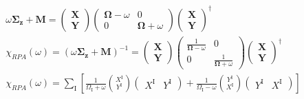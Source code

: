 \documentclass[12pt]{article}
\begin{document}
\begin{align}
\omega \mathbf{\Sigma_z} + \mathbf{M} = \begin{pmatrix}
\mathbf{X} \\
\mathbf{Y}
\end{pmatrix}
\begin{pmatrix}
\mathbf{\Omega } - \omega & 0 \\
0 & \mathbf{\Omega } + \omega
\end{pmatrix}
\begin{pmatrix}
\mathbf{X} \\
\mathbf{Y}
\end{pmatrix}^\dagger \\
\chi_{RPA}(\omega) = \left(\omega \mathbf{\Sigma_z} + \mathbf{M}\right)^{-1} = \begin{pmatrix}
\mathbf{X} \\
\mathbf{Y}
\end{pmatrix}
\begin{pmatrix}
\frac{1}{\mathbf{\Omega } - \omega} & 0 \\
0 & \frac{1}{\mathbf{\Omega } + \omega}
\end{pmatrix}
\begin{pmatrix}
\mathbf{X} \\
\mathbf{Y}
\end{pmatrix}^\dagger \\
\chi_{RPA}(\omega) = \sum_{\mathrm{I}}\left[\frac{1}{\Omega_{\mathrm{I}}+\omega}\binom{X^{\mathrm{I}}}{Y^{\mathrm{I}}}\left(\begin{array}{ll}
X^{\mathrm{I}} & Y^{\mathrm{I}}
\end{array}\right)+\frac{1}{\Omega_{\mathrm{I}}-\omega}\binom{Y^{\mathrm{I}}}{X^{\mathrm{I}}}\left(\begin{array}{ll}
Y^{\mathrm{I}} & X^{\mathrm{I}}
\end{array}\right)\right]
\end{align}
\end{document}
